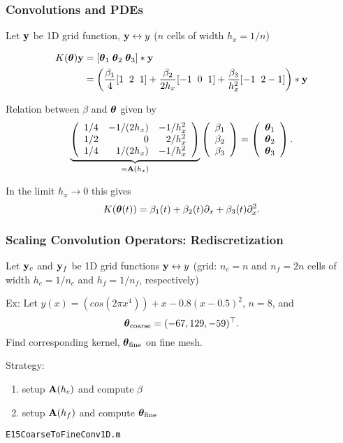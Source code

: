 \documentclass[12pt,fleqn,handout]{beamer}
\begin{document}
\begin{frame}\frametitle{Convolutions and PDEs}

Let ${\bf y}$ be 1D grid function, ${\bf y} \leftrightarrow y$ ($n$ cells of width $h_x=1/n$)

\begin{align*}
K({\boldsymbol \theta}){\bf y} & = [{\boldsymbol \theta}_1\; {\boldsymbol \theta}_2\; {\boldsymbol \theta}_3] * {\bf y}  \\
 & =\left(\frac{\beta_1}{4} [1\;\; 2\;\; 1]  + \frac{\beta_2}{2h_x} [-1\;\; 0 \;\; 1] + \frac{\beta_3}{h_x^2}[-1\;\; 2 -1] \right) * {\bf y}
\end{align*}

\pause
Relation between $\beta$ and ${\boldsymbol \theta}$ given by
$$
	\underbrace{
	\left( 
		\begin{array}{rrr}
			1/4 & -1/(2h_x) & -1/h_x^2 \\
			1/2 & 0            & 2/h_x^2  \\
			1/4 & 1/(2h_x)  & -1/h_x^2
		\end{array}
	\right)}_{={\bf A}(h_x)}
	\left( 
		\begin{array}{r}
			\beta_1 \\ 
			\beta_2 \\
			\beta_3
		\end{array}
	\right)
	=
	\left( 
		\begin{array}{r}
			{\boldsymbol \theta}_1 \\ 
			{\boldsymbol \theta}_2 \\
			{\boldsymbol \theta}_3
		\end{array}
	\right).
$$

\bigskip
\pause

In the limit $h_x \to 0$ this gives
$$
	K({\boldsymbol \theta}(t)) = \beta_1(t) + \beta_2(t) \partial_x + \beta_3(t) \partial_x^2.
$$
\pause

\end{frame}

\begin{frame}
	\frametitle{Scaling Convolution Operators: Rediscretization}
	
	Let ${\bf y}_c$ and ${\bf y}_f$ be 1D grid functions ${\bf y} \leftrightarrow y$ (grid: $n_c=n$ and $n_f=2n$ cells of width $h_c=1/n_c$ and $h_f = 1/n_f$, respectively)
	
	\bigskip
	\pause
	
	Ex: Let $y(x) = (cos(2 \pi x^4))+x-0.8(x-0.5)^2$, $n = 8$, and
	$$
		{\boldsymbol \theta}_{\rm coarse} = (-67,  129, -59)^\top.
	$$
	Find corresponding kernel, ${\boldsymbol \theta}_{\rm fine}$  on fine mesh.
	
	\bigskip
	\pause
	
	Strategy:
	\begin{enumerate}
		\item setup ${\bf A}(h_c)$ and compute $\beta$
		\item setup ${\bf A}(h_f)$ and compute ${\boldsymbol \theta}_{\rm fine}$
	\end{enumerate}
	
	\bigskip

	\begin{center}
		\texttt{E15CoarseToFineConv1D.m}
	\end{center}
	
\end{frame}
\end{document}
